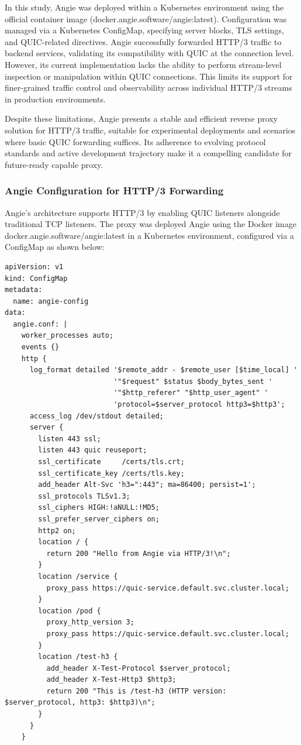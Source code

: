 In this study, Angie was deployed within a Kubernetes environment using the official container image (docker.angie.software/angie:latest). Configuration was managed via a Kubernetes ConfigMap, specifying server blocks, TLS settings, and QUIC-related directives. Angie successfully forwarded HTTP/3 traffic to backend services, validating its compatibility with QUIC at the connection level. However, its current implementation lacks the ability to perform stream-level inspection or manipulation within QUIC connections. This limits its support for finer-grained traffic control and observability across individual HTTP/3 streams in production environments.

Despite these limitations, Angie presents a stable and efficient reverse proxy solution for HTTP/3 traffic, suitable for experimental deployments and scenarios where basic QUIC forwarding suffices. Its adherence to evolving protocol standards and active development trajectory make it a compelling candidate for future-ready capable proxy.

\subsubsection{Angie Configuration for HTTP/3 Forwarding}
Angie's architecture supports HTTP/3 by enabling QUIC listeners alongside traditional TCP listeners. The proxy was deployed Angie using the Docker image docker.angie.software/angie:latest in a Kubernetes environment, configured via a ConfigMap as shown below:

\begin{lstlisting}[breaklines=true,basicstyle=\small\ttfamily,frame=single]
apiVersion: v1
kind: ConfigMap
metadata:
  name: angie-config
data:
  angie.conf: |
    worker_processes auto;
    events {}
    http {
      log_format detailed '$remote_addr - $remote_user [$time_local] '
                          '"$request" $status $body_bytes_sent '
                          '"$http_referer" "$http_user_agent" '
                          'protocol=$server_protocol http3=$http3';
      access_log /dev/stdout detailed;
      server {
        listen 443 ssl;
        listen 443 quic reuseport;
        ssl_certificate     /certs/tls.crt;
        ssl_certificate_key /certs/tls.key;
        add_header Alt-Svc 'h3=":443"; ma=86400; persist=1';
        ssl_protocols TLSv1.3;
        ssl_ciphers HIGH:!aNULL:!MD5;
        ssl_prefer_server_ciphers on;
        http2 on;
        location / {
          return 200 "Hello from Angie via HTTP/3!\n";
        }
        location /service {
          proxy_pass https://quic-service.default.svc.cluster.local;
        }
        location /pod {
          proxy_http_version 3;
          proxy_pass https://quic-service.default.svc.cluster.local;
        }
        location /test-h3 {
          add_header X-Test-Protocol $server_protocol;
          add_header X-Test-Http3 $http3;
          return 200 "This is /test-h3 (HTTP version: $server_protocol, http3: $http3)\n";
        }
      }
    }
\end{lstlisting}

